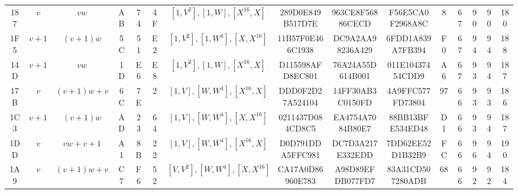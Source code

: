 \begin{table}
\begin{tabular}{|c|c|c|c|c|c|c|c|c|c|c|c|c|c|c|}
187 & $v$ & $vw$ & AB & 74 & 4F & $[1, V^2], [1, W], [X^{16}, X]$ & 289D0E849B517D7E & 963CE8F56886CECD & F56E5CA0F2968A8C & 8 & 67 &  90 & 90 & 180 \\
1F5 & $v + 1$ & $(v + 1)w$ & 5C & 51 & E2 & $[1, V^2], [1, W^4], [X, X^{16}]$ & 11B57F0E466C1938 & DC9A2AA98236A429 & 6FDD1A839A7FB394 & F0 & 67 &  94 & 94 & 188 \\
14D & $v + 1$ & $vw$ & 1D & E6 & E8 & $[1, V^2], [1, W], [X^{16}, X]$ & D115598AFD8EC801 & 76A24A55D614B001 & 011E10437454CDD9 & A6 & 67 &  93 & 94 & 187 \\
17B & $v$ & $(v + 1)w + v$ & 6C & 7E & 2 & $[1, V], [W, W^4], [X^{16}, X]$ & DDD0F2D27A524104 & 14FF30AB3C0150FD & 4A9FFC577FD73804 & 97 & 66 &  93 & 93 & 186 \\
1C3 & $v + 1$ & $(v + 1)w$ & AD & 23 & 64 & $[1, V], [W, W^4],[X, X^{16}]$ & 0211437D084CD8C5 & EA4754A7084B80E7 & 88BB13BFE534ED48 & D1 & 66 &  93 & 94 & 187 \\
1DD & $v$ & $vw + v + 1$ & A1 & 8B & 22 & $[1, V], [W, W^4], [X^{16}, X]$ & D0D791DDA5FFC981 & DC7D3A217E332EDD & 7DD62EE52D1B32B9 & FC & 66 &  96 & 94 & 190 \\
1A9 & $v$ & $(v + 1)w + v$ & C7 & F6 & 52 & $[V, V^2], [W, W^4], [X, X^{16}]$ & CA17A0D86960E783 & A98D89EFDB077FD7 & 83A31CD507280ADB & 68 & 66 &  92 & 92 & 184 \\ \hline
    \end{tabular}
\end{table}



